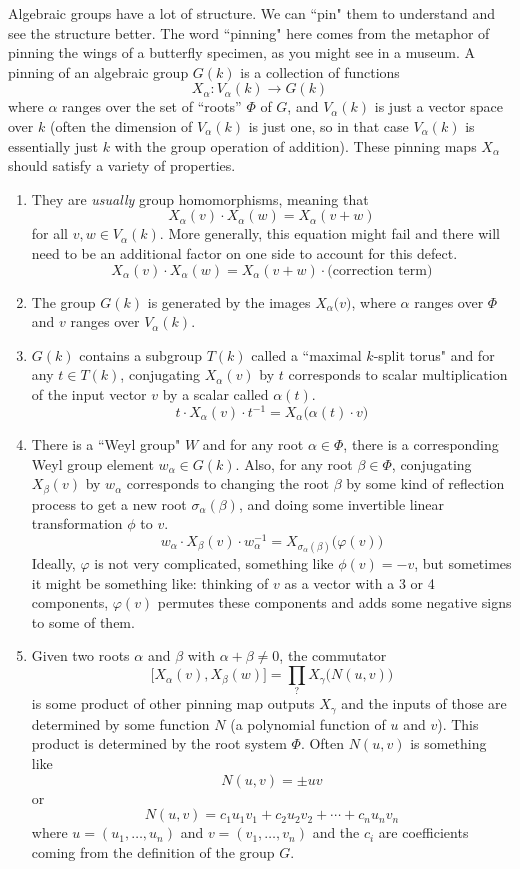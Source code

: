 \documentclass[12pt]{article}
\theoremstyle{definition}
\newcommand{\sig}{\sigma}
\newcommand{\inv}{^{-1}}
\begin{document}
Algebraic groups have a lot of structure. We can ``pin" them to understand and see the structure better. The word ``pinning" here comes from the metaphor of pinning the wings of a butterfly specimen, as you might see in a museum. A pinning of an algebraic group $G(k)$ is a collection of functions
\[
	X_\alpha:V_\alpha(k) \to G(k)
\]
where $\alpha$ ranges over the set of ``roots'' $\Phi$ of $G$, and $V_\alpha(k)$ is just a vector space over $k$ (often the dimension of $V_\alpha(k)$ is just one, so in that case $V_\alpha(k)$ is essentially just $k$ with the group operation of addition). These pinning maps $X_\alpha$ should satisfy a variety of properties.
\begin{enumerate}[(P1)]
	\item They are \textit{usually} group homomorphisms, meaning that
	\[
		X_\alpha(v) \cdot X_\alpha(w) = X_\alpha(v+w)
	\]
	for all $v,w \in V_\alpha(k)$. More generally, this equation might fail and there will need to be an additional factor on one side to account for this defect.
	\[
		X_\alpha(v) \cdot X_\alpha(w) = X_{\alpha}(v+w) \cdot \Big( \text{correction term} \Big)
	\]
	\item The group $G(k)$ is generated by the images $X_\alpha \big( v \big)$, where $\alpha$ ranges over $\Phi$ and $v$ ranges over $V_\alpha(k)$.
	\item $G(k)$ contains a subgroup $T(k)$ called a ``maximal $k$-split torus" and for any $t \in T(k)$, conjugating $X_\alpha(v)$ by $t$ corresponds to scalar multiplication of the input vector $v$ by a scalar called $\alpha(t)$.
	\[
		t \cdot X_\alpha(v) \cdot t \inv = X_\alpha \Big( \alpha(t) \cdot v \Big)
	\]
	\item There is a ``Weyl group" $W$ and for any root $\alpha \in \Phi$, there is a corresponding Weyl group element $w_\alpha \in G(k)$. Also, for any root $\beta \in \Phi$, conjugating $X_\beta(v)$ by $w_\alpha$ corresponds to changing the root $\beta$ by some kind of reflection process to get a new root $\sig_\alpha(\beta)$, and doing some invertible linear transformation $\phi$ to $v$.
	\[
		w_\alpha \cdot X_\beta(v) \cdot w_\alpha \inv = X_{\sig_\alpha(\beta)} \Big( \varphi(v) \Big)
	\]
	Ideally, $\varphi$ is not very complicated, something like $\phi(v) = -v$, but sometimes it might be something like: thinking of $v$ as a vector with a 3 or 4 components, $\varphi(v)$ permutes these components and adds some negative signs to some of them.
	\item Given two roots $\alpha$ and $\beta$ with $\alpha+\beta \neq 0$, the commutator
	\[
		\Big[ X_\alpha(v), X_\beta(w) \Big] = \prod_{?} X_\gamma\Big( N(u,v) \Big)
	\]
	is some product of other pinning map outputs $X_{\gamma}$ and the inputs of those are determined by some function $N$ (a polynomial function of $u$ and $v$). This product is determined by the root system $\Phi$. Often $N(u,v)$ is something like
\[
	N(u,v) = \pm uv
\]
or
\[
	N(u,v) = c_1 u_1 v_1 + c_2 u_2 v_2 + \cdots + c_n u_n v_n
\]
where $u = (u_1, \ldots, u_n)$ and $v = (v_1, \ldots, v_n)$ and the $c_i$ are coefficients coming from the definition of the group $G$.
\end{enumerate}
\end{document}
